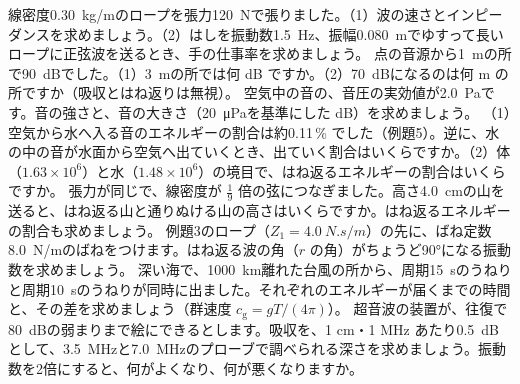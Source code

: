 \bkendproblems
{}
\bkproblem 線密度\qty{0.30}{kg/m}のロープを張力\qty{120}{N}で張りました。（1）波の速さとインピーダンスを求めましょう。（2）はしを振動数\qty{1.5}{Hz}、振幅\qty{0.080}{m}でゆすって長いロープに正弦波を送るとき、手の仕事率を求めましょう。
\bkproblem 点の音源から\qty{1}{m}の所で\qty{90}{dB}でした。（1）\qty{3}{m}の所では何 dB ですか。（2）\qty{70}{dB}になるのは何 m の所ですか（吸収とはね返りは無視）。
\bkproblem 空気中の音の、音圧の実効値が\qty{2.0}{Pa}です。音の強さと、音の大きさ（\qty{20}{\micro\pascal}を基準にした dB）を求めましょう。
\bkproblem （1）空気から水へ入る音のエネルギーの割合は約0.11\,\% でした（例題5）。逆に、水の中の音が水面から空気へ出ていくとき、出ていく割合はいくらですか。（2）体（$1.63\times10^6$）と水（$1.48\times10^6$）の境目で、はね返るエネルギーの割合はいくらですか。
\bkproblem 張力が同じで、線密度が $\tfrac19$ 倍の弦につなぎました。高さ\qty{4.0}{cm}の山を送ると、はね返る山と通りぬける山の高さはいくらですか。はね返るエネルギーの割合も求めましょう。
\bkproblem 例題3のロープ（$Z_1=\qty{4.0}{N.s/m}$）の先に、ばね定数\qty{8.0}{N/m}のばねをつけます。はね返る波の角（$r$ の角）がちょうど90°になる振動数を求めましょう。
\bkproblem 深い海で、\qty{1000}{km}離れた台風の所から、周期\qty{15}{s}のうねりと周期\qty{10}{s}のうねりが同時に出ました。それぞれのエネルギーが届くまでの時間と、その差を求めましょう（群速度 $c_{\mathrm g}=gT/(4\pi)$）。
\bkproblem 超音波の装置が、往復で\qty{80}{dB}の弱まりまで絵にできるとします。吸収を、1 cm・1 MHz あたり\qty{0.5}{dB}として、\qty{3.5}{MHz}と\qty{7.0}{MHz}のプローブで調べられる深さを求めましょう。振動数を2倍にすると、何がよくなり、何が悪くなりますか。
